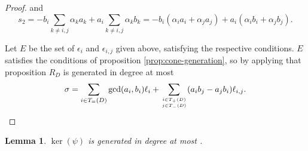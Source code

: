 \documentclass{amsart}
\theoremstyle{plain}
\newtheorem{lem}[thm]{Lemma}
\theoremstyle{definition}
\theoremstyle{remark}
\numberwithin{equation}{section}
\newcommand\bida{a}
\newcommand\bidb{b}
\begin{document}
\begin{proof}
\noindent
and
\[
	s_2 = -\bidb_i \sum_{k \ne i,j} \alpha_k \bida_k + \bida_i \sum_{k \ne i, j}
	\alpha_k \bidb_k = -b_i (\alpha_i a_i + \alpha_j a_j) + a_i (\alpha_i b_i + \alpha_j b_j).
\]

Let $E$ be the set of $\epsilon_i$ and $\epsilon_{i,j}$ given 
above, satisfying the respective conditions.
$E$ satisfies the conditions of proposition \ref{prop:cone-generation}, so by applying that proposition $R_D$ is generated in 
degree at most
\[
	\sigma = \sum_{i\in T_=(D)} \gcd(\bida_i, \bidb_i)\ell_i + \sum_{i\in T_+(D) \atop
	j \in T_-(D)} (\bida_i \bidb_j- \bida_j \bidb_i)\ell_{i,j}.
\]
\end{proof}

\begin{lem}
$\ker(\psi)$ is generated in degree at most .
\end{lem}
\end{document}
